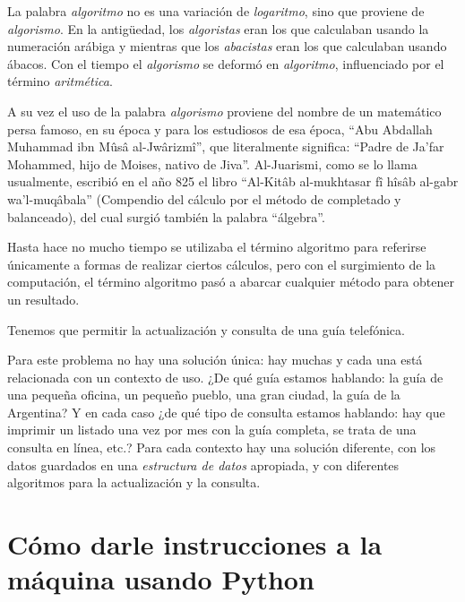 \begin{sabias_que}
La palabra \textit{algoritmo} no es una variación de \textit{logaritmo},
sino que proviene de \textit{algorismo}. En la antigüedad, los
\textit{algoristas} eran los que calculaban usando la numeración arábiga y
mientras que los \textit{abacistas} eran los que calculaban usando ábacos.
Con el tiempo el \textit{algorismo} se deformó en \textit{algoritmo},
influenciado por el término \textit{aritmética}.

A su vez el uso de la palabra \textit{algorismo} proviene del nombre de un
matemático persa famoso, en su época y para los estudiosos de esa época,
``Abu Abdallah Muhammad ibn Mûsâ al-Jwârizmî'', que literalmente significa:
``Padre de Ja'far Mohammed, hijo de Moises, nativo de Jiva''. Al-Juarismi,
como se lo llama usualmente, escribió en el año 825 el libro ``Al-Kitâb
al-mukhtasar fî hîsâb al-gabr wa'l-muqâbala'' (Compendio del cálculo por el
método de completado y balanceado), del cual surgió también la palabra
``álgebra''.

Hasta hace no mucho tiempo se utilizaba el término algoritmo para referirse
únicamente a formas de realizar ciertos cálculos, pero con el surgimiento
de la computación, el término algoritmo pasó a abarcar cualquier método
para obtener un resultado.
\end{sabias_que}

\begin{problemac}

Tenemos que permitir la actualización y consulta de una guía
telefónica.

\end{problemac}

Para este problema no hay una solución única: hay muchas y cada
una está relacionada con un contexto de uso. ¿De qué guía estamos
hablando: la guía de una pequeña oficina, un pequeño pueblo, una
gran ciudad, la guía de la Argentina? Y en cada caso ¿de qué tipo
de consulta estamos hablando: hay que imprimir un listado una vez
por mes con la guía completa, se trata de una consulta en línea,
etc.? Para cada contexto hay una solución diferente, con los datos
guardados en una {\it estructura de datos} apropiada, y con
diferentes algoritmos para la actualización y la consulta.

%
%

\section{Cómo darle instrucciones a la máquina usando Python}

